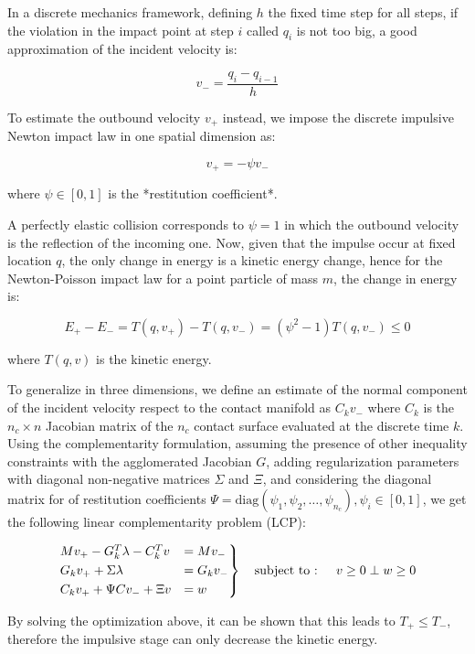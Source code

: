 In a discrete mechanics framework, defining $h$ the fixed time step for all steps, if the violation in the impact point at step $i$ called $q _i$ is not too big, a good approximation of the incident velocity is:

\begin{equation}
    v _{-} = \frac{q _i - q _{i-1}}{h}
\end{equation}

To estimate the outbound velocity $v _{+}$ instead, we impose the discrete impulsive Newton impact law in one spatial dimension as:

\begin{equation}
    v _{+} = -\psi v _{-}
\end{equation}

where $\psi \in [0,1]$ is the *restitution coefficient*.

A perfectly elastic collision corresponds to $\psi = 1$ in which the outbound velocity is the reflection of the incoming one. Now, given that the impulse occur at fixed location $q$, the only change in energy is a kinetic energy change, hence for the Newton-Poisson impact law for a point particle of mass $m$, the change in energy is:

\begin{equation}
    E _{+} - E _{-} = T(q, v _{+}) - T(q, v _{-}) = (\psi ^2 - 1) T(q, v _{-}) \leq 0
\end{equation}

where $T(q, v)$ is the kinetic energy.

To generalize in three dimensions, we define an estimate of the normal component of the incident velocity respect to the contact manifold as $C _k v _{-}$ where $C _k$ is the $n _c \times n$ Jacobian matrix of the $n _c$ contact surface evaluated at the discrete time $k$. Using the complementarity formulation, assuming the presence of other inequality constraints with the agglomerated Jacobian $G$, adding regularization parameters with diagonal non-negative matrices $\Sigma$ and $\Xi$, and considering the diagonal matrix for of restitution coefficients $\Psi = \text{diag}(\psi _1, \psi _2, \dots, \psi _{n _c}),  \psi _i \in [0, 1]$, we get the following linear complementarity problem (LCP):

\begin{equation}
    \begin{rcases}
        Mv _{+} - G ^T _k \lambda - C ^T _k v & = M v _{-}    \\
        G _k v _{+} + \Sigma \lambda          & = G _k v _{-} \\
        C _k v _{+} + \Psi C v _{-} + \Xi v   & = w           \\
    \end{rcases} \quad \text{subject to
        :  } \quad v \geq 0 \perp w \geq 0
\end{equation}

By solving the optimization above, it can be shown that this leads to $T _{+} \leq T _{-}$, therefore the impulsive stage can only decrease the kinetic energy.